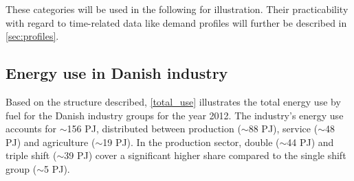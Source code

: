 \documentclass[review]{elsarticle}
\begin{document}
These categories will be used in the following for illustration. Their practicability with regard to time-related data like demand profiles will further be described in \autoref{sec:profiles}.

\subsection{Energy use in Danish industry}
\label{sec:energy_use}

Based on the structure described, \autoref{total_use} illustrates the total energy use by fuel for the Danish industry groups for the year 2012.
The industry's energy use accounts for $\sim$156 PJ, distributed between production ($\sim$88 PJ), service ($\sim$48 PJ) and agriculture ($\sim$19 PJ). In the production sector, double ($\sim$44 PJ) and triple shift ($\sim$39 PJ) cover a significant higher share compared to the single shift group ($\sim$5 PJ).
\end{document}
